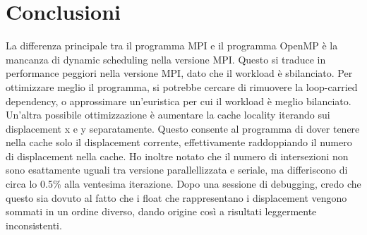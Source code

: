 \documentclass[a4paper,12pt, twoside]{report}
\begin{document}
\section*{Conclusioni}
La differenza principale tra il programma MPI e il programma OpenMP è la mancanza di dynamic scheduling nella versione MPI.
Questo si traduce in performance peggiori nella versione MPI, dato che il workload è sbilanciato.
Per ottimizzare meglio il programma, si potrebbe cercare di rimuovere la loop-carried dependency, o approssimare un'euristica per cui il workload è meglio bilanciato.
Un'altra possibile ottimizzazione è aumentare la cache locality iterando sui displacement x e y separatamente.
Questo consente al programma di dover tenere nella cache solo il displacement corrente, effettivamente raddoppiando il numero di displacement nella cache.
Ho inoltre notato che il numero di intersezioni non sono esattamente uguali tra versione parallellizzata e seriale, ma differiscono di circa lo 0.5\% alla ventesima iterazione. Dopo una sessione di debugging,
credo che questo sia dovuto al fatto che i float che rappresentano i displacement vengono sommati in un ordine diverso, dando origine così a risultati leggermente inconsistenti.
\printbibliography
\appendix
\end{document}
